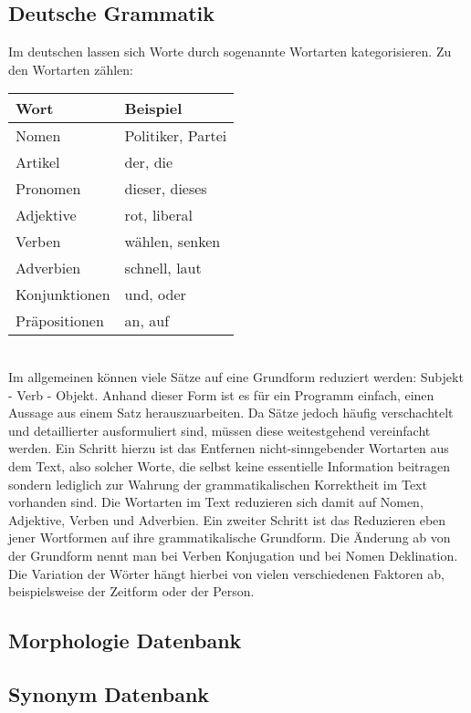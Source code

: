 \subsection{Deutsche Grammatik	}
Im deutschen lassen sich Worte durch sogenannte Wortarten kategorisieren. Zu den Wortarten zählen: \\
\begin{tabular}{ll}
\hline
Wort & Beispiel \\
\hline
Nomen & Politiker, Partei \\
Artikel & der, die \\
Pronomen & dieser, dieses \\
Adjektive & rot, liberal \\
Verben & wählen, senken \\
Adverbien & schnell, laut \\
Konjunktionen & und, oder \\
Präpositionen & an, auf \\
\hline
\end{tabular} \\
Im allgemeinen können viele Sätze auf eine Grundform reduziert werden: Subjekt - Verb - Objekt. Anhand dieser Form ist es für ein Programm einfach,
einen Aussage aus einem Satz herauszuarbeiten. Da Sätze jedoch häufig verschachtelt und detaillierter ausformuliert sind, müssen diese weitestgehend vereinfacht
werden. Ein Schritt hierzu ist das Entfernen nicht-sinngebender Wortarten aus dem Text, also solcher Worte, die selbst keine essentielle Information beitragen 
sondern lediglich zur Wahrung der grammatikalischen Korrektheit im Text vorhanden sind. Die Wortarten im Text reduzieren sich damit auf Nomen, Adjektive, Verben
und Adverbien.
Ein zweiter Schritt ist das Reduzieren eben jener Wortformen auf ihre grammatikalische Grundform. Die Änderung ab von der Grundform nennt man bei Verben Konjugation
und bei Nomen Deklination. Die Variation der Wörter hängt hierbei von vielen verschiedenen Faktoren ab, beispielsweise der Zeitform oder der Person.

\subsection{Morphologie Datenbank	}
\subsection{Synonym Datenbank}
